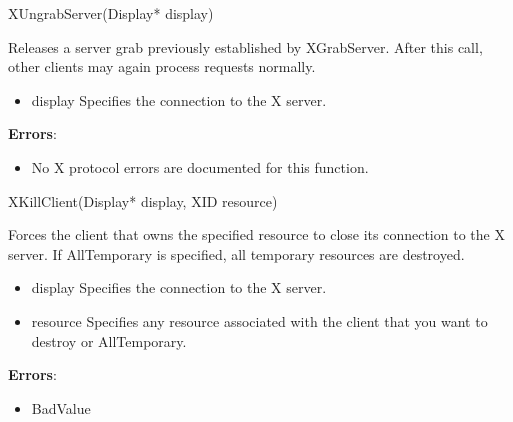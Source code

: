 \documentclass{report}
\begin{document}
\begin{itemize}
        \begin{cppcode}
            XUngrabServer(Display* display)
        \end{cppcode}
        \bigbreak \noindent
        Releases a server grab previously established by XGrabServer. After this call, other clients may again process requests normally.
        \begin{itemize}
            \item display Specifies the connection to the X server.
        \end{itemize}
        \bigbreak \noindent
        \textbf{Errors}:
        \begin{itemize}
            \item No X protocol errors are documented for this function.
        \end{itemize}

        \begin{cppcode}
            XKillClient(Display* display, XID resource)
        \end{cppcode}
        \bigbreak \noindent
        Forces the client that owns the specified resource to close its connection to the X server. If AllTemporary is specified, all temporary resources are destroyed.
        \begin{itemize}
            \item display Specifies the connection to the X server.
            \item resource Specifies any resource associated with the client that you want to destroy or AllTemporary.
        \end{itemize}
        \bigbreak \noindent
        \textbf{Errors}:
        \begin{itemize}
            \item BadValue
        \end{itemize}


\end{itemize}
\end{document}
